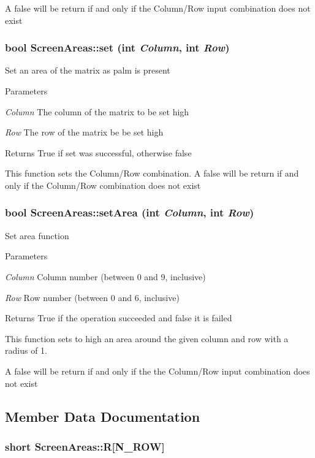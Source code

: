 A false will be return if and only if the Column/Row input combination does not exist \hypertarget{classScreenAreas_a585e561af59233e6c0e131fac4c3147e}{
\subsubsection[{set}]{\setlength{\rightskip}{0pt plus 5cm}bool ScreenAreas::set (int {\em Column}, \/  int {\em Row})}}
\label{classScreenAreas_a585e561af59233e6c0e131fac4c3147e}
Set an area of the matrix as palm is present 
\begin{DoxyParams}{Parameters}
\item[{\em Column}]The column of the matrix to be set high \item[{\em Row}]The row of the matrix be be set high\end{DoxyParams}
\begin{DoxyReturn}{Returns}
True if set was successful, otherwise false
\end{DoxyReturn}
This function sets the Column/Row combination. A false will be return if and only if the Column/Row combination does not exist \hypertarget{classScreenAreas_abdef604ad12331d1b7ddfe825df93197}{
\subsubsection[{setArea}]{\setlength{\rightskip}{0pt plus 5cm}bool ScreenAreas::setArea (int {\em Column}, \/  int {\em Row})}}
\label{classScreenAreas_abdef604ad12331d1b7ddfe825df93197}
Set area function


\begin{DoxyParams}{Parameters}
\item[{\em Column}]Column number (between 0 and 9, inclusive) \item[{\em Row}]Row number (between 0 and 6, inclusive)\end{DoxyParams}
\begin{DoxyReturn}{Returns}
True if the operation succeeded and false it is failed
\end{DoxyReturn}
This function sets to high an area around the given column and row with a radius of 1.

A false will be return if and only if the the Column/Row input combination does not exist 

\subsection{Member Data Documentation}
\hypertarget{classScreenAreas_a29a5e603100adb61d72fcf43cbe75521}{
\subsubsection[{R}]{\setlength{\rightskip}{0pt plus 5cm}short {\bf ScreenAreas::R}\mbox{[}N\_\-ROW\mbox{]}}}
\label{classScreenAreas_a29a5e603100adb61d72fcf43cbe75521}



